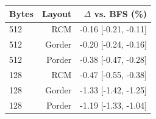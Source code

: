 \begin{tabular}{lrr}
\toprule
Bytes & Layout & $\Delta$ vs. BFS (\%) \\
\midrule
512 & RCM & -0.16 [-0.21, -0.11] \\
512 & Gorder & -0.20 [-0.24, -0.16] \\
512 & Porder & -0.38 [-0.47, -0.28] \\
128 & RCM & -0.47 [-0.55, -0.38] \\
128 & Gorder & -1.33 [-1.42, -1.25] \\
128 & Porder & -1.19 [-1.33, -1.04] \\
\bottomrule
\end{tabular}
